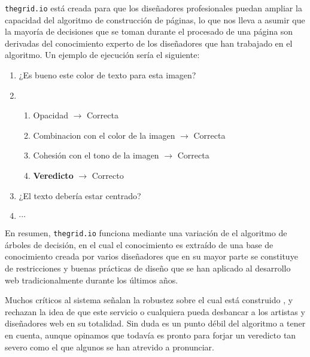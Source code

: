 \texttt{thegrid.io} está creada para que los diseñadores profesionales
puedan ampliar la capacidad del algoritmo de construcción de páginas, lo
que nos lleva a asumir que la mayoría de decisiones que se toman durante
el procesado de una página son derivadas del conocimiento experto de los
diseñadores que han trabajado en el algoritmo. Un ejemplo de ejecución
sería el siguiente:

\begin{enumerate}
  \item ¿Es bueno este color de texto para esta imagen?
  \item 
  \begin{enumerate}
    \item Opacidad $\rightarrow$ Correcta  
    \item Combinacion con el color de la imagen $\rightarrow$ Correcta  
    \item Cohesión con el tono de la imagen $\rightarrow$ Correcta  
    \item \textbf{Veredicto} $\rightarrow$ Correcto
  \end{enumerate}
  \item ¿El texto debería estar centrado?
  \item $\cdots$
\end{enumerate}

En resumen, \texttt{thegrid.io} funciona mediante una variación de el 
algoritmo de árboles de decisión, en el cual el conocimiento es extraído
de una base de conocimiento creada por varios diseñadores que en su
mayor parte se constituye de restricciones y buenas prácticas de diseño
que se han aplicado al desarrollo web tradicionalmente durante los 
últimos años.

Muchos críticos al sistema señalan la robustez sobre el cual está 
construido \cite{the_grid_better}, y rechazan la idea de que este servicio o cualquiera pueda
desbancar a los artistas y diseñadores web en su totalidad. Sin duda es
un punto débil del algoritmo a tener en cuenta, aunque opinamos que todavía
es pronto para forjar un veredicto tan severo como el que algunos se han
atrevido a pronunciar.
